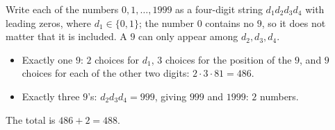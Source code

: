 Write each of the numbers $0,1,\dots,1999$ as a four-digit string $d_1d_2d_3d_4$ with leading zeros, where $d_1\in\{0,1\}$; the number $0$ contains no $9$, so it does not matter that it is included. A $9$ can only appear among $d_2,d_3,d_4$.
\begin{itemize}
\item Exactly one $9$: $2$ choices for $d_1$, $3$ choices for the position of the $9$, and $9$ choices for each of the other two digits: $2\cdot3\cdot81=486$.
\item Exactly three $9$'s: $d_2d_3d_4=999$, giving $999$ and $1999$: $2$ numbers.
\end{itemize}
The total is $486+2=\boxed{488}$.
